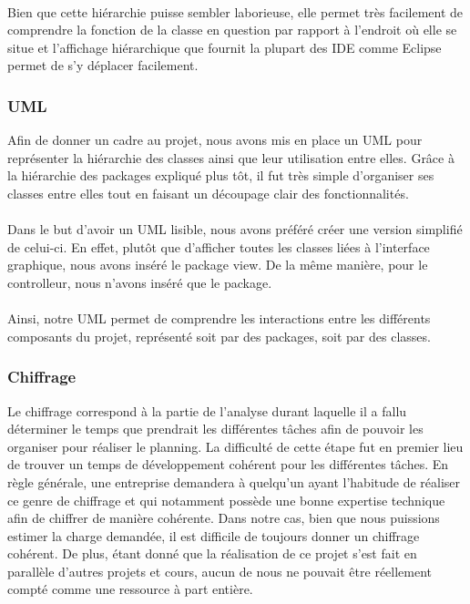 \documentclass[a4paper,11pt]{article}
\begin{document}
\paragraph{} Bien que cette hiérarchie puisse sembler laborieuse, elle permet très facilement de comprendre la fonction de la classe en question par rapport à l'endroit où elle se situe et l'affichage hiérarchique que fournit la plupart des IDE comme Eclipse permet de s'y déplacer facilement.

\subsubsection{UML}
Afin de donner un cadre au projet, nous avons mis en place un UML pour représenter la hiérarchie des classes ainsi que leur utilisation entre elles. Grâce à la hiérarchie des packages expliqué plus tôt, il fut très simple d'organiser ses classes entre elles tout en faisant un découpage clair des fonctionnalités. 

\paragraph{} Dans le but d'avoir un UML lisible, nous avons préféré créer une version simplifié de celui-ci. En effet, plutôt que d'afficher toutes les classes liées à l'interface graphique, nous avons inséré le package view. De la même manière, pour le controlleur, nous n'avons inséré que le package.

\paragraph{} Ainsi, notre UML permet de comprendre les interactions entre les différents composants du projet, représenté soit par des packages, soit par des classes.

\subsubsection{Chiffrage}
Le chiffrage correspond à la partie de l'analyse durant laquelle il a fallu déterminer le temps que prendrait les différentes tâches afin de pouvoir les organiser pour réaliser le planning. La difficulté de cette étape fut en premier lieu de trouver un temps de développement cohérent pour les différentes tâches. En règle générale, une entreprise demandera à quelqu'un ayant l'habitude de réaliser ce genre de chiffrage et qui notamment possède une bonne expertise technique afin de chiffrer de manière cohérente. Dans notre cas, bien que nous puissions estimer la charge demandée, il est difficile de toujours donner un chiffrage cohérent. De plus, étant donné que la réalisation de ce projet s'est fait en parallèle d'autres projets et cours, aucun de nous ne pouvait être réellement compt\'e comme une ressource à part entière.
\end{document}
